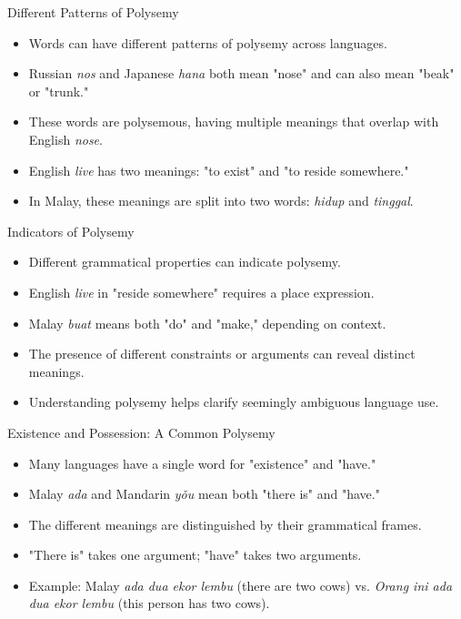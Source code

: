 \documentclass{beamer}
\begin{document}
\begin{frame}{Different Patterns of Polysemy}
    \begin{itemize}
        \item Words can have different patterns of polysemy across languages.
        \item Russian \textit{nos} and Japanese \textit{hana} both mean "nose" and can also mean "beak" or "trunk."
        \item These words are polysemous, having multiple meanings that overlap with English \textit{nose}.
        \item English \textit{live} has two meanings: "to exist" and "to reside somewhere."
        \item In Malay, these meanings are split into two words: \textit{hidup} and \textit{tinggal}.
    \end{itemize}
\end{frame}

\begin{frame}{Indicators of Polysemy}
    \begin{itemize}
        \item Different grammatical properties can indicate polysemy.
        \item English \textit{live} in "reside somewhere" requires a place expression.
        \item Malay \textit{buat} means both "do" and "make," depending on context.
        \item The presence of different constraints or arguments can reveal distinct meanings.
        \item Understanding polysemy helps clarify seemingly ambiguous language use.
    \end{itemize}
\end{frame}

\begin{frame}{Existence and Possession: A Common Polysemy}
    \begin{itemize}
        \item Many languages have a single word for "existence" and "have."
        \item Malay \textit{ada} and Mandarin \textit{yǒu} mean both "there is" and "have."
        \item The different meanings are distinguished by their grammatical frames.
        \item "There is" takes one argument; "have" takes two arguments.
        \item Example: Malay \textit{ada dua ekor lembu} (there are two cows) vs. \textit{Orang ini ada dua ekor lembu} (this person has two cows).
    \end{itemize}
\end{frame}
\end{document}
